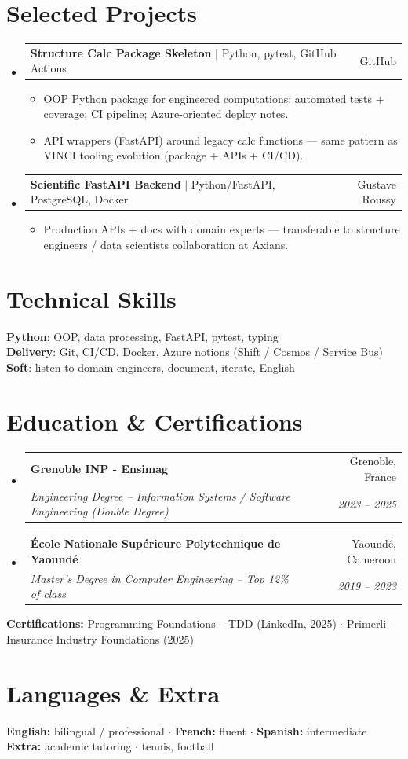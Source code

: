 \documentclass[letterpaper,10.5pt]{article}
\makeatletter
\newcommand{\resumeItem}[1]{\item\small{#1 \vspace{-1.5pt}}}
\newcommand{\resumeSubheading}[4]{
  \vspace{-1pt}\item
    \begin{tabular*}{0.97\textwidth}[t]{l@{\extracolsep{\fill}}r}
      \textbf{#1} & #2 \\
      \textit{\small#3} & \textit{\small #4} \\
    \end{tabular*}\vspace{-5pt}
}
\newcommand{\resumeProjectHeading}[2]{
    \item
    \begin{tabular*}{0.97\textwidth}{l@{\extracolsep{\fill}}r}
      \small#1 & #2 \\
    \end{tabular*}\vspace{-5pt}
}
\newcommand{\resumeSubHeadingListStart}{\begin{itemize}[leftmargin=0.15in, label={}]}
\newcommand{\resumeSubHeadingListEnd}{\end{itemize}}
\newcommand{\resumeItemListStart}{\begin{itemize}[leftmargin=0.18in]}
\newcommand{\resumeItemListEnd}{\end{itemize}\vspace{-3pt}}
\makeatother
\begin{document}
\section{Selected Projects}

\resumeSubHeadingListStart
  \resumeProjectHeading
    {\textbf{Structure Calc Package Skeleton} $|$ Python, pytest, GitHub Actions}{GitHub}
    \resumeItemListStart
      \resumeItem{OOP Python package for engineered computations; automated tests + coverage; CI pipeline; Azure-oriented deploy notes.}
      \resumeItem{API wrappers (FastAPI) around legacy calc functions --- same pattern as VINCI tooling evolution (package + APIs + CI/CD).}
    \resumeItemListEnd
  \resumeProjectHeading
    {\textbf{Scientific FastAPI Backend} $|$ Python/FastAPI, PostgreSQL, Docker}{Gustave Roussy}
    \resumeItemListStart
      \resumeItem{Production APIs + docs with domain experts --- transferable to structure engineers / data scientists collaboration at Axians.}
    \resumeItemListEnd
\resumeSubHeadingListEnd

\section{Technical Skills}

\begin{itemize}[leftmargin=0.15in, label={}]
  \small{\item{
\textbf{Python}: OOP, data processing, FastAPI, pytest, typing \\
\textbf{Delivery}: Git, CI/CD, Docker, Azure notions (Shift / Cosmos / Service Bus) \\
\textbf{Soft}: listen to domain engineers, document, iterate, English
  }}
\end{itemize}

\section{Education \& Certifications}

\resumeSubHeadingListStart
  \resumeSubheading
    {Grenoble INP - Ensimag}{Grenoble, France}
    {Engineering Degree -- Information Systems / Software Engineering (Double Degree)}{2023 -- 2025}
  \resumeSubheading
    {\'Ecole Nationale Sup\'erieure Polytechnique de Yaound\'e}{Yaound\'e, Cameroon}
    {Master's Degree in Computer Engineering -- Top 12\% of class}{2019 -- 2023}
\resumeSubHeadingListEnd
\small{
\textbf{Certifications:} Programming Foundations -- TDD (LinkedIn, 2025) $\cdot$ Primerli -- Insurance Industry Foundations (2025)
}

\section{Languages \& Extra}
\small{
\textbf{English:} bilingual / professional $\cdot$ \textbf{French:} fluent $\cdot$ \textbf{Spanish:} intermediate \\
\textbf{Extra:} academic tutoring $\cdot$ tennis, football
}
\end{document}
